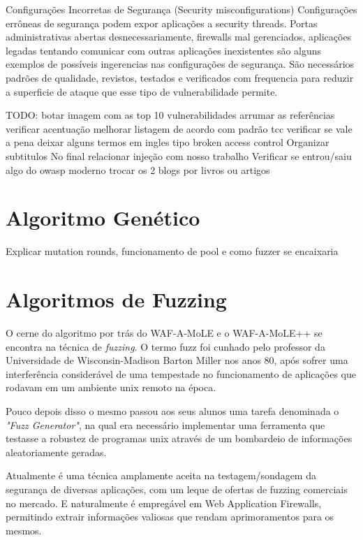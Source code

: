 Configurações Incorretas de Segurança (Security misconfigurations)
Configurações errôneas de segurança podem expor aplicações a security threads. Portas administrativas abertas desnecessariamente, firewalls mal gerenciados, aplicações legadas tentando comunicar com outras aplicações inexistentes são alguns exemplos de possíveis ingerencias nas configurações de segurança. São necessários padrões de qualidade, revistos, testados e verificados com frequencia para reduzir a superficie de ataque que esse tipo de vulnerabilidade permite.


TODO:
botar imagem com as top 10 vulnerabilidades
arrumar as referências
verificar acentuação
melhorar listagem de acordo com padrão tcc
verificar se vale a pena deixar alguns termos em ingles tipo broken access control
Organizar subtitulos
No final relacionar injeção com nosso trabalho
Verificar se entrou/saiu algo do owasp moderno
trocar os 2 blogs por livros ou artigos



\section{Algoritmo Genético}

Explicar mutation rounds, funcionamento de pool e como fuzzer se encaixaria

\section{Algoritmos de Fuzzing}

O cerne do algoritmo por trás do WAF-A-MoLE e o WAF-A-MoLE++ se encontra na técnica de \textit{fuzzing}. O termo fuzz foi cunhado pelo professor da Universidade de Wisconsin-Madison Barton Miller nos anos 80, após sofrer uma interferência considerável de uma tempestade no funcionamento de aplicações que rodavam em um ambiente unix remoto na época. 

Pouco depois disso o mesmo passou aos seus alunos uma tarefa denominada o \textit{"Fuzz Generator"}, na qual era necessário implementar uma ferramenta que testasse a robustez de programas unix através de um bombardeio de informações aleatoriamente geradas.

Atualmente é uma técnica amplamente aceita na testagem/sondagem da segurança de diversas aplicações, com um leque de ofertas de fuzzing comerciais no mercado. E naturalmente é empregável em Web Application Firewalls, permitindo extrair informações valiosas que rendam aprimoramentos para os mesmos.

